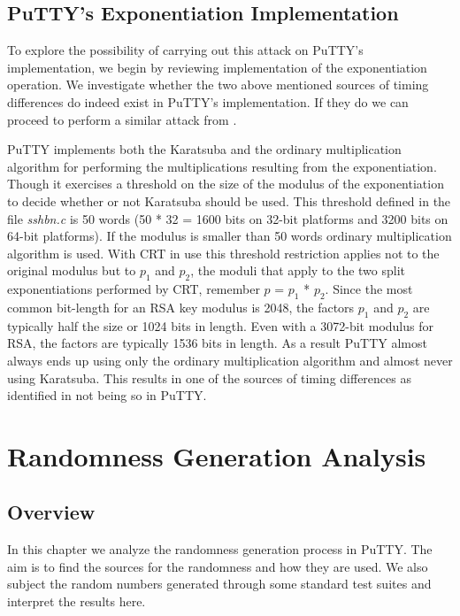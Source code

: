 \documentclass{report}
\begin{document}
\section{PuTTY's Exponentiation Implementation}
To explore the possibility of carrying out this attack on PuTTY's implementation, we begin by reviewing implementation of the exponentiation operation. We investigate whether the two above mentioned sources of timing differences do indeed exist in PuTTY's implementation. If they do we can proceed to perform a similar attack from \cite{brumley}.\par
PuTTY implements both the Karatsuba and the ordinary multiplication algorithm for performing the multiplications resulting from the exponentiation. Though it exercises a  threshold on the size of the modulus of the exponentiation to decide whether or not Karatsuba should be used. This threshold defined in the file \textit{sshbn.c} is 50 words (50 * 32 = 1600 bits on 32-bit platforms and 3200 bits on 64-bit platforms). If the modulus is smaller than 50 words ordinary multiplication algorithm is used. With CRT in use this threshold restriction applies not to the original modulus but to \(p_1\) and \(p_2\), the moduli that apply to the two split exponentiations performed by CRT, remember \(p\) = \(p_1\) * \(p_2\). Since the most common bit-length for an RSA key modulus is 2048, the factors \(p_1\) and \(p_2\) are typically half the size or 1024 bits in length. Even with a 3072-bit modulus for RSA, the factors are typically 1536 bits in length. As a result PuTTY almost always ends up using only the ordinary multiplication algorithm and almost never using Karatsuba. This results in one of the sources of timing differences as identified in \cite{brumley} not being so in PuTTY.\par

\chapter{Randomness Generation Analysis}
\section{Overview}
In this chapter we analyze the randomness generation process in PuTTY. The aim is to find the sources for the randomness and how they are used. We also subject the random numbers generated through some standard test suites and interpret the results here.
\end{document}
